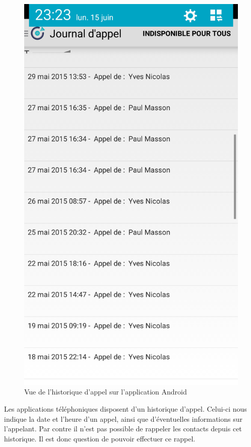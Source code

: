 \begin{figure}[!h]
	\centering
	\includegraphics[scale=0.1]{img/historique.png}
	\caption{\label{historique} {Vue de l'historique d'appel sur l'application Android}}
\end{figure}

Les applications téléphoniques disposent d'un historique d'appel. Celui-ci nous indique la date et l'heure d'un appel, ainsi que d'éventuelles informations sur l'appelant. Par contre il n'est pas possible de rappeler les contacts depuis cet historique. Il est donc question de pouvoir effectuer ce rappel.

